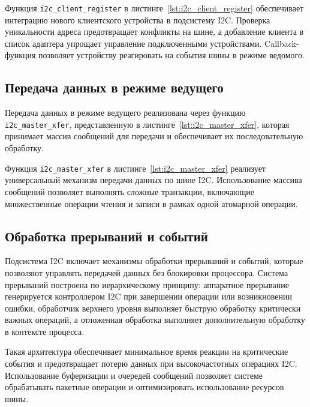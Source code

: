 \begin{listing}[H]
	\caption{Функция регистрации клиентского устройства}
	\label{lst:i2c_client_register}
\end{listing}

Функция \texttt{i2c\_client\_register} в листинге~\ref{lst:i2c_client_register} обеспечивает интеграцию нового клиентского устройства в подсистему I2C. Проверка уникальности адреса предотвращает конфликты на шине, а добавление клиента в список адаптера упрощает управление подключенными устройствами. Callback-функция позволяет устройству реагировать на события шины в режиме ведомого.

\subsection{Передача данных в режиме ведущего}

Передача данных в режиме ведущего реализована через функцию \texttt{i2c\_master\_xfer}, представленную в листинге~\ref{lst:i2c_master_xfer}, которая принимает массив сообщений для передачи и обеспечивает их последовательную обработку.

\begin{listing}[H]
	\caption{Функция передачи данных в режиме ведущего}
	\label{lst:i2c_master_xfer}
\end{listing}

Функция \texttt{i2c\_master\_xfer} в листинге~\ref{lst:i2c_master_xfer} реализует универсальный механизм передачи данных по шине I2C. Использование массива сообщений позволяет выполнять сложные транзакции, включающие множественные операции чтения и записи в рамках одной атомарной операции.

\subsection{Обработка прерываний и событий}

Подсистема I2C включает механизмы обработки прерываний и событий, которые позволяют управлять передачей данных без блокировки процессора. Система прерываний построена по иерархическому принципу: аппаратное прерывание генерируется контроллером I2C при завершении операции или возникновении ошибки, обработчик верхнего уровня выполняет быструю обработку критически важных операций, а отложенная обработка выполняет дополнительную обработку в контексте процесса.

Такая архитектура обеспечивает минимальное время реакции на критические события и предотвращает потерю данных при высокочастотных операциях I2C. Использование буферизации и очередей сообщений позволяет системе обрабатывать пакетные операции и оптимизировать использование ресурсов шины.

